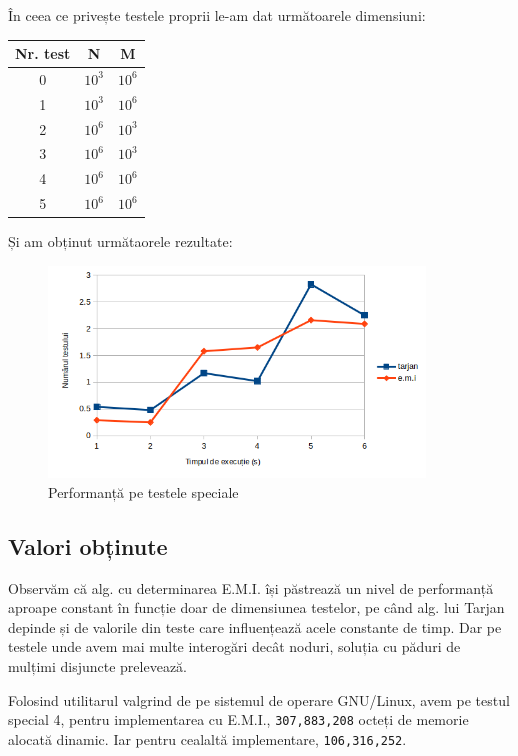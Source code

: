 \documentclass[runningheads]{llncs}
\begin{document}
În ceea ce privește testele proprii le-am dat următoarele dimensiuni:

\begin{center}
 \begin{tabular}{||c c c||} 
 \hline
 Nr. test & N & M \\
 \hline\hline
 0 & $10^3$ & $10^6$ \\ 
 \hline\hline
 1 & $10^3$ & $10^6$ \\
 \hline\hline
 2 & $10^6$ & $10^3$ \\
 \hline\hline
 3 & $10^6$ & $10^3$ \\
 \hline\hline
 4 & $10^6$ & $10^6$ \\
 \hline
 5 & $10^6$ & $10^6$ \\
 \hline
\end{tabular}
\end{center}

Și am obținut următaorele rezultate:

\begin{figure}
    \centering
    \includegraphics[width=10cm]{custom.png}
    \caption{Performanță pe testele speciale}
    \label{custom_teste}
\end{figure}

\subsection{Valori obținute}

Observăm că alg. cu determinarea E.M.I. își păstrează un nivel de performanță aproape constant în funcție doar de dimensiunea testelor, pe când alg. lui Tarjan depinde și de valorile din teste care influențează acele constante de timp. Dar pe testele unde avem mai multe interogări decât noduri, soluția cu păduri de mulțimi disjuncte prelevează.

Folosind utilitarul valgrind de pe sistemul de operare GNU/Linux, avem pe testul special 4, pentru implementarea cu E.M.I., \texttt{307,883,208} octeți de memorie alocată dinamic. Iar pentru cealaltă implementare, \texttt{106,316,252}.
\end{document}

